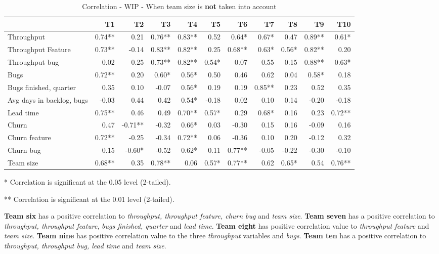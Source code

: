 \documentclass[UKenglish]{ifimaster}  %
\begin{document}
\begin{table}[H]
 \begin{adjustwidth}{-3cm}{}
 \centering
 \begin{tabular}{|l|r|r|r|r|r|r|r|r|r|r|}
\hline
 & \bf{T1} & \bf{T2} & \bf{T3} & \bf{T4} & \bf{T5} & \bf{T6} & \bf{T7} & \bf{T8} & \bf{T9} & \bf{T10}\\ \hline
 Throughput  & 0.74** & 0.21 & 0.76** & 0.83** & 0.52 & 0.64* & 0.67* & 0.47 & 0.89** & 0.61* \\ \hline
 Throughput Feature  & 0.73** & -0.14 & 0.83** & 0.82** & 0.25 & 0.68** & 0.63* & 0.56* & 0.82** & 0.20 \\ \hline
 Throughput bug  & 0.02 & 0.25 & 0.73** & 0.82** & 0.54* & 0.07 & 0.55 & 0.15 & 0.88** & 0.63* \\ \hline
 Bugs  & 0.72** & 0.20 & 0.60* & 0.56* & 0.50 & 0.46 & 0.62 & 0.04 & 0.58* & 0.18 \\ \hline
 Bugs finished, quarter  & 0.35 & 0.10 & -0.07 & 0.56* & 0.19 & 0.19 & 0.85** & 0.23 & 0.52 & 0.35 \\ \hline
 Avg days in backlog, bugs  & -0.03 & 0.44 & 0.42 & 0.54* & -0.18 & 0.02 & 0.10 & 0.14 & -0.20 & -0.18 \\ \hline
 Lead time  & 0.75** & 0.46 & 0.49 & 0.70** & 0.57* & 0.29 & 0.68* & 0.16 & 0.23 & 0.72** \\ \hline
 Churn  & 0.47 & -0.71** & -0.32 & 0.66* & 0.03 & -0.30 & 0.15 & 0.16 & -0.09 & 0.16 \\ \hline
 Churn feature  & 0.72** & -0.25 & -0.34 & 0.72** & 0.06 & -0.36 & 0.10 & 0.20 & -0.12 & 0.32 \\ \hline
 Churn bug  & 0.15 & -0.60* & -0.52 & 0.62* & 0.11 & 0.77** & -0.05 & -0.22 & -0.30 & -0.10 \\ \hline
 Team size  & 0.68** & 0.35 & 0.78** & 0.06 & 0.57* & 0.77** & 0.62 & 0.65* & 0.54 & 0.76**\\ \hline
\end{tabular}
 \caption{Correlation - WIP - When team size is \textbf{not} taken into account}
\label{corr:WIP}
 \centerline {* Correlation is significant at the 0.05 level (2-tailed).}
\centerline{** Correlation is significant at the 0.01 level (2-tailed).}
\end{adjustwidth}
\end{table}

\textbf{Team six} has a positive correlation to \textit{throughput, throughput feature, churn bug} and \textit{team size}. \textbf{Team seven} has a positive correlation to \textit{throughput, throughput feature}, \textit{bugs finished, quarter} and \textit{lead time}. \textbf{Team eight} has positive correlation value to \textit{throughput feature} and \textit{team size}. \textbf{Team nine} has positive correlation value to the three \textit{throughput} variables and \textit{bugs}. \textbf{Team ten} has a positive correlation to \textit{throughput, throughput bug, lead time} and \textit{team size}. 
\end{document}
